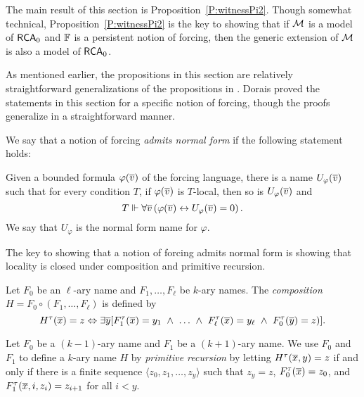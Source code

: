 The main result of this section is Proposition~\ref{P:witnessPi2}.
Though somewhat technical, Proposition~\ref{P:witnessPi2} is the key
to showing that if $\mathcal{M}$ is a model of $\mathsf{RCA}_0$ and $\mathbb{F}$ is a
persistent notion of forcing, then the generic extension of $\mathcal{M}$ is also a model of $\mathsf{RCA}_0$.

As mentioned earlier, the propositions in this section are
relatively straightforward generalizations of the propositions in \cite{varMathias}.
Dorais proved the statements in this section for a specific notion of forcing,
though the proofs generalize in a straightforward manner.

\begin{definition}\label{D:admitsNormal}
We say that a notion of forcing \textit{admits normal form}
if the following statement holds:

Given a bounded formula $\varphi(\overline{v})$ of the forcing language,
there is a name $U_\varphi(\overline{v})$ such that for every condition $T$,
if $\varphi(\overline{v})$ is $T$-local, then so is $U_\varphi(\overline{v})$ and
$$T\Vdash\forall\overline{v}\left(\varphi(\overline{v})\leftrightarrow U_\varphi(\overline{v})=0\right).$$
We say that $U_\varphi$ is the normal form name for $\varphi$.
\end{definition}

The key to showing that a notion of forcing admits normal form
is showing that locality is closed under composition and primitive recursion.

\begin{definition}\label{D:comp&pr}
Let $F_0$ be an $\ell$-ary name and $F_1,\ldots,F_\ell$ be $k$-ary names.
The \textit{composition} $H=F_0\circ(F_1,\ldots,F_\ell)$ is defined by
$$H^\tau(\tup{x})=z\Leftrightarrow \exists\tup{y}
[F_1^\tau(\tup{x})=y_1\ \land\ \ldots\ \land\ F_\ell^\tau(\tup{x})=y_\ell\ \land\ F_0^\tau(\tup{y})=z)].$$

Let $F_0$ be a $(k-1)$-ary name and $F_1$ be a $(k+1)$-ary name.
We use $F_0$ and $F_1$ to define a $k$-ary name $H$ by \textit{primitive recursion} by letting
$H^\tau(\overline{x},y)=z$ if and only if there is a finite sequence
$\langle z_0,z_1,\ldots,z_{y}\rangle$ such that $z_{y}=z$,
$F_0^\tau(\overline{x})=z_0$, and $F_1^\tau(\overline{x},i,z_i)=z_{i+1}$ for all $i<y$.
\end{definition}

